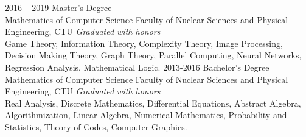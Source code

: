 \documentclass[9pt]{developercv} %
\begin{document}

\begin{entrylist}
	\entry
		{2016 -- 2019}
		{Master's Degree\\\footnotesize{Mathematics of Computer Science}}
		{Faculty of Nuclear Sciences and Physical Engineering, CTU}
        {\emph{Graduated with honors}\\Game Theory, Information Theory, Complexity Theory, Image Processing, Decision Making Theory, Graph Theory, Parallel Computing, Neural Networks, Regression Analysis, Mathematical Logic.}
	\entry
		{2013-2016}
		{Bachelor's Degree\\\footnotesize{Mathematics of Computer Science}}
		{Faculty of Nuclear Sciences and Physical Engineering, CTU}
		{\emph{Graduated with honors}\\Real Analysis, Discrete Mathematics, Differential Equations, Abstract Algebra, Algorithmization, Linear Algebra, Numerical Mathematics, Probability and Statistics, Theory of Codes, Computer Graphics.}
\end{entrylist}


\end{document}
